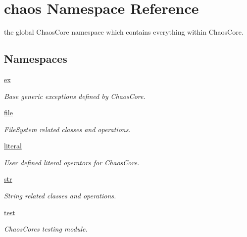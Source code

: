\hypertarget{namespacechaos}{}\section{chaos Namespace Reference}
\label{namespacechaos}


the global Chaos\+Core namespace which contains everything within Chaos\+Core.  


\subsection*{Namespaces}
\begin{DoxyCompactItemize}
\item 
 \hyperlink{namespacechaos_1_1ex}{ex}
\begin{DoxyCompactList}\small\item\em Base generic exceptions defined by Chaos\+Core. \end{DoxyCompactList}\item 
 \hyperlink{namespacechaos_1_1file}{file}
\begin{DoxyCompactList}\small\item\em File\+System related classes and operations. \end{DoxyCompactList}\item 
 \hyperlink{namespacechaos_1_1literal}{literal}
\begin{DoxyCompactList}\small\item\em User defined literal operators for Chaos\+Core. \end{DoxyCompactList}\item 
 \hyperlink{namespacechaos_1_1str}{str}
\begin{DoxyCompactList}\small\item\em String related classes and operations. \end{DoxyCompactList}\item 
 \hyperlink{namespacechaos_1_1test}{test}
\begin{DoxyCompactList}\small\item\em Chaos\+Core\textquotesingle{}s testing module. \end{DoxyCompactList}\end{DoxyCompactItemize}
